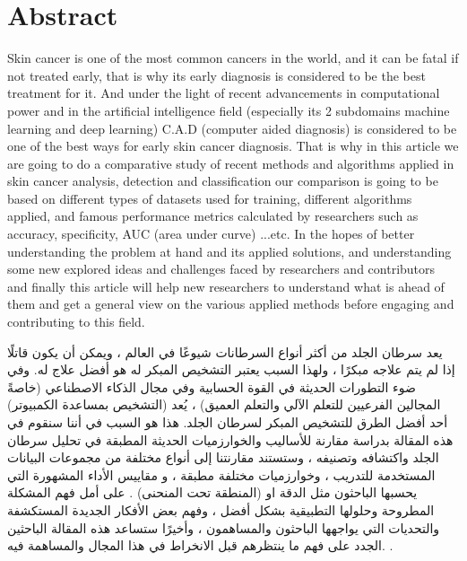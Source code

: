 \section*{Abstract}
Skin cancer is one of the most common cancers in the world, and it can be fatal if not treated early, that is why its early diagnosis is considered to be the best treatment for it. And under the light of recent advancements in computational power and in the artificial intelligence field (especially its 2 subdomains machine learning and deep learning) C.A.D (computer aided diagnosis) is considered to be one of the best ways for early skin cancer diagnosis. That is why in this article we are going to do a comparative study of recent methods and algorithms applied in skin cancer analysis, detection and classification our comparison is going to be based on different types of datasets used for training, different algorithms applied, and famous performance metrics calculated by researchers such as accuracy, specificity, AUC (area under curve) ...etc. In the hopes of better understanding the problem at hand and its applied solutions, and understanding some new explored ideas and challenges faced by researchers and contributors and finally this article will help new researchers to understand what is ahead of them and get a general view on the various applied methods before engaging and contributing to this field.

\begin{center}
\end{center}
\begin{RLtext}

    يعد سرطان الجلد من أكثر أنواع السرطانات شيوعًا في العالم ، ويمكن أن يكون قاتلًا إذا لم يتم علاجه مبكرًا ، ولهذا السبب يعتبر التشخيص المبكر له هو أفضل علاج له. وفي ضوء التطورات الحديثة في القوة الحسابية وفي مجال الذكاء الاصطناعي (خاصةً المجالين الفرعيين للتعلم الآلي والتعلم العميق) ، يُعد  (التشخيص بمساعدة الكمبيوتر) أحد أفضل الطرق للتشخيص المبكر لسرطان الجلد. هذا هو السبب في أننا سنقوم في هذه المقالة بدراسة مقارنة للأساليب والخوارزميات الحديثة المطبقة في تحليل سرطان الجلد واكتشافه وتصنيفه ، وستستند مقارنتنا إلى أنواع مختلفة من مجموعات البيانات المستخدمة للتدريب ، وخوارزميات مختلفة مطبقة ، و مقاييس الأداء المشهورة التي يحسبها الباحثون مثل الدقة او  (المنطقة تحت المنحنى)  . على أمل فهم المشكلة المطروحة وحلولها التطبيقية بشكل أفضل ، وفهم بعض الأفكار الجديدة المستكشفة والتحديات التي يواجهها الباحثون والمساهمون ، وأخيرًا ستساعد هذه المقالة الباحثين الجدد على فهم ما ينتظرهم قبل الانخراط في هذا المجال والمساهمة فيه. .


\end{RLtext}



